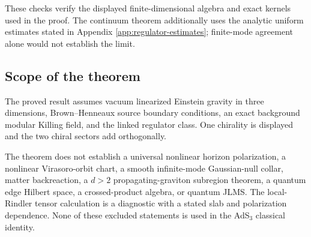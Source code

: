 These checks verify the displayed finite-dimensional algebra and exact kernels used in the proof. The continuum theorem additionally uses the analytic uniform estimates stated in Appendix \ref{app:regulator-estimates}; finite-mode agreement alone would not establish the limit.

\subsection{Scope of the theorem}

The proved result assumes vacuum linearized Einstein gravity in three dimensions, Brown--Henneaux source boundary conditions, an exact background modular Killing field, and the linked regulator class. One chirality is displayed and the two chiral sectors add orthogonally.

The theorem does not establish a universal nonlinear horizon polarization, a nonlinear Virasoro-orbit chart, a smooth infinite-mode Gaussian-null collar, matter backreaction, a $d>2$ propagating-graviton subregion theorem, a quantum edge Hilbert space, a crossed-product algebra, or quantum JLMS. The local-Rindler tensor calculation is a diagnostic with a stated slab and polarization dependence. None of these excluded statements is used in the AdS$_3$ classical identity.
